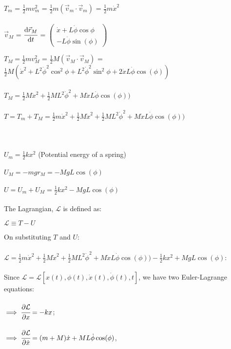 \documentclass[11pt]{article}
\newcommand{\Lagr}{\mathcal{L}}
\begin{document}
\begin{enumerate}
$T_m$ = $\frac{1}{2}mv_m^2$ = $\frac{1}{2} m (\vec{v}_m \cdot \vec{v}_m)$ = $\frac{1}{2} m \dot{x}^2$
\\ \\
$\vec{v}_M$ = $\cfrac{\mathrm{d} \vec{r}_M}{\mathrm{d} t}$ = 
$\begin{pmatrix}
  \dot{x} + L\dot{\phi}\cos{\phi}\\
  -L\dot{\phi}\sin(\phi)  
\end{pmatrix}$

$T_M = \frac{1}{2}mv_M^2$ = $\frac{1}{2} M (\vec{v}_M \cdot \vec{v}_M)$ = $\frac{1}{2} M (\dot{x}^2 + L^2 \dot{\phi}^2 \cos^2{\phi} + L^2 \dot{\phi}^2 \sin^2{\phi} + 2\dot{x}L\dot{\phi}\cos(\phi))$
\\ \\
$T_M = \frac{1}{2} M \dot{x}^2 + \frac{1}{2} M L^2 \dot{\phi}^2 + M \dot{x}L\dot{\phi}\cos(\phi))$
\\ \\
$T = T_m + T_M = \frac{1}{2} m \dot{x}^2 + \frac{1}{2} M \dot{x}^2 + \frac{1}{2} M L^2 \dot{\phi}^2 + M \dot{x}L\dot{\phi}\cos(\phi))$
\\ \\
\\ \\
$U_m = \frac{1}{2}kx^2$ (Potential energy of a spring)
\\ \\
$U_M = -mgr_M = -MgL\cos(\phi)$
\\ \\
$U = U_m + U_M = \frac{1}{2}kx^2 -MgL\cos(\phi)$
\\ \\
The Lagrangian, $\Lagr$ is defined as:
\begin{center}
  $\Lagr \equiv  T - U$
\end{center}
On substituting $T$ and $U$:
\\ \\
$\Lagr = \frac{1}{2} m \dot{x}^2 + \frac{1}{2} M \dot{x}^2 + \frac{1}{2} M L^2 \dot{\phi}^2 + M \dot{x}L\dot{\phi}\cos(\phi)) - \frac{1}{2}kx^2 +MgL\cos(\phi)$:
\\ \\
Since $\Lagr = \Lagr [ x(t), \phi (t), \dot{x}(t), \dot{\phi}(t), t]$, we have two Euler-Lagrange equations:
\\ \\
$\implies \cfrac{\partial \Lagr}{\partial x} = -kx$;
\\ \\
$\implies \cfrac{\partial \Lagr}{\partial \dot{x}} = (m+M)\dot{x} + ML\dot{\phi}\cos(\phi)$,

\end{enumerate}
\end{document}
